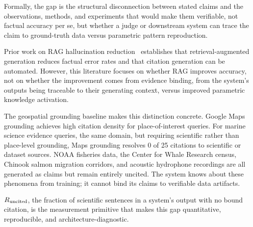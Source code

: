 Formally, the gap is the structural disconnection between stated claims and the observations,
methods, and experiments that would make them verifiable, not factual accuracy per se, but
whether a judge or downstream system can trace the claim to ground-truth data versus parametric
pattern reproduction.

Prior work on RAG hallucination reduction~\cite{arxiv230915217,arxiv230514627,arxiv240115884,arxiv231109533,arxiv230514292}
establishes that retrieval-augmented generation reduces factual error rates and that citation generation
can be automated. However, this literature focuses on whether RAG improves accuracy, not on whether
the improvement comes from evidence binding, from the system's outputs being traceable to their
generating context, versus improved parametric knowledge activation.

The geospatial grounding baseline makes this distinction concrete. Google Maps grounding achieves high
citation density for place-of-interest queries. For marine science evidence queries, the same domain,
but requiring scientific rather than place-level grounding, Maps grounding resolves 0 of 25 citations
to scientific or dataset sources. NOAA fisheries data, the Center for Whale Research census, Chinook
salmon migration corridors, and acoustic hydrophone recordings are all generated as claims but remain
entirely uncited. The system knows about these phenomena from training; it cannot bind its claims to
verifiable data artifacts.

$R_{\mathrm{uncited}}$, the fraction of scientific sentences in a system's output with no bound
citation, is the measurement primitive that makes this gap quantitative, reproducible, and
architecture-diagnostic.

